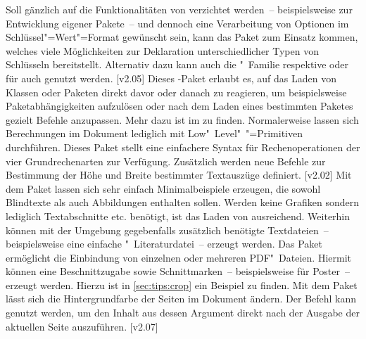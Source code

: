 \begin{DeclarePackages}
  Soll gänzlich auf die Funktionalitäten von  verzichtet 
  werden~-- beispielsweise zur Entwicklung eigener Pakete~-- und dennoch eine 
  Verarbeitung von Optionen im Schlüssel"=Wert"=Format gewünscht sein, kann das 
  Paket  zum Einsatz kommen, welches viele Möglichkeiten zur 
  Deklaration unterschiedlicher Typen von Schlüsseln bereitstellt. Alternativ 
  dazu kann auch die "~Familie respektive  oder 
  für  auch  genutzt werden.
[v2.05]
  Dieses \KOMAScript-Paket erlaubt es, auf das Laden von Klassen oder Paketen 
  direkt davor oder danach zu reagieren, um beispielsweise Paketabhängigkeiten 
  aufzulösen oder nach dem Laden eines bestimmten Paketes gezielt Befehle 
  anzupassen. Mehr dazu ist im \scrguide zu finden.
  Normalerweise lassen sich Berechnungen im Dokument lediglich mit 
  Low"~Level"~"=Primitiven durchführen. Dieses Paket stellt eine 
  einfachere Syntax für Rechenoperationen der vier Grundrechenarten zur 
  Verfügung. Zusätzlich werden neue Befehle zur Bestimmung der Höhe und Breite 
  bestimmter Textauszüge definiert.
[v2.02]
  Mit dem Paket  lassen sich sehr einfach Minimalbeispiele 
  erzeugen, die sowohl Blindtexte als auch Abbildungen enthalten sollen. Werden 
  keine Grafiken sondern lediglich Textabschnitte etc. benötigt, ist das Laden 
  von  ausreichend. Weiterhin können mit der Umgebung 
   gegebenfalls zusätzlich benötigte Textdateien~-- 
  beispielsweise eine einfache "~Literaturdatei~-- erzeugt werden.
  Das Paket ermöglicht die Einbindung von einzelnen oder mehreren PDF"~Dateien.
  Hiermit können eine Beschnittzugabe sowie Schnittmarken~-- beispielsweise für 
  Poster~-- erzeugt werden. Hierzu ist in \autoref{sec:tips:crop} ein Beispiel 
  zu finden.
  Mit dem Paket lässt sich die Hintergrundfarbe der Seiten im Dokument ändern.
  Der Befehl  kann genutzt werden, um den 
  Inhalt aus dessen Argument direkt nach der Ausgabe der aktuellen Seite 
  auszuführen.
  [v2.07]

\end{DeclarePackages}
